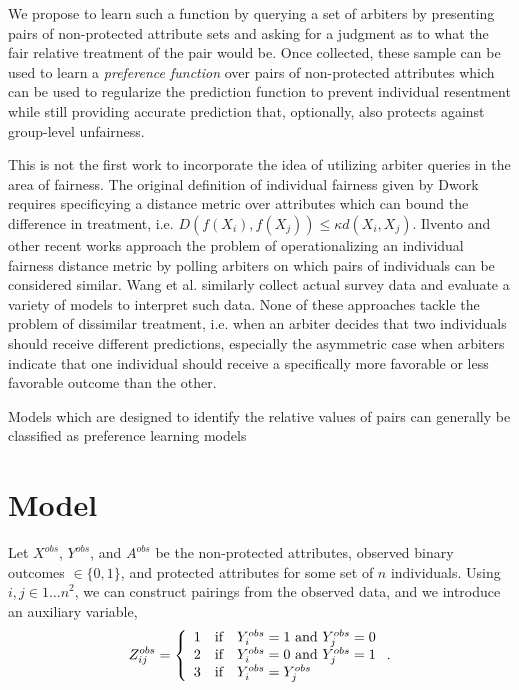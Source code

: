     We propose to learn such a function by querying a set of arbiters by presenting pairs of non-protected attribute sets and asking for a judgment as to what the fair relative treatment of the pair would be. Once collected, these sample can be used to learn a \emph{preference function} over pairs of non-protected attributes which can be used to regularize the prediction function to prevent individual resentment while still providing accurate prediction that, optionally, also protects against group-level unfairness.

    This is not the first work to incorporate the idea of utilizing arbiter queries in the area of fairness.  The original definition of individual fairness given by Dwork \cite{dwork2012fairness} requires specificying a distance metric over attributes which can bound the difference in treatment, i.e. $D\left(f(X_i), f(X_j)\right) \le \kappa d(X_i, X_j)$.  Ilvento\cite{ilvento2019metric} and other recent works \cite{jung2019eliciting,lahoti2019operationalizing,wang2019empirical} approach the problem of operationalizing an individual fairness distance metric by polling arbiters on which pairs of individuals can be considered similar.  Wang et al.\cite{wang2019empirical} similarly collect actual survey data and evaluate a variety of models to interpret such data.  None of these approaches tackle the problem of dissimilar treatment, i.e. when an arbiter decides that two individuals should receive different predictions, especially the asymmetric case when arbiters indicate that one individual should receive a specifically more favorable or less favorable outcome than the other.
    
    Models which are designed to identify the relative values of pairs can generally be classified as preference learning models\cite{peters2018scalable} 
    

\section{Model}\label{sec:softmono_model}

    Let $X^{obs}$, $Y^{obs}$, and $A^{obs}$ be the non-protected attributes, observed binary outcomes $\in \{0, 1\}$, and protected attributes for some set of $n$ individuals.  Using $i, j \in {1 \ldots n}^2$, we can construct pairings from the observed data, and we introduce an auxiliary variable,
    $$ Z_{ij}^{obs} = \left\{ \begin{array}{l c l}
        1 & \mbox{if} & Y_i^{obs} = 1 \mbox{~and~} Y_j^{obs} = 0 \\
        2 & \mbox{if} & Y_i^{obs} = 0 \mbox{~and~} Y_j^{obs} = 1 \\
        3 & \mbox{if} & Y_i^{obs} = Y_j^{obs}
    \end{array}\right. .$$
    
